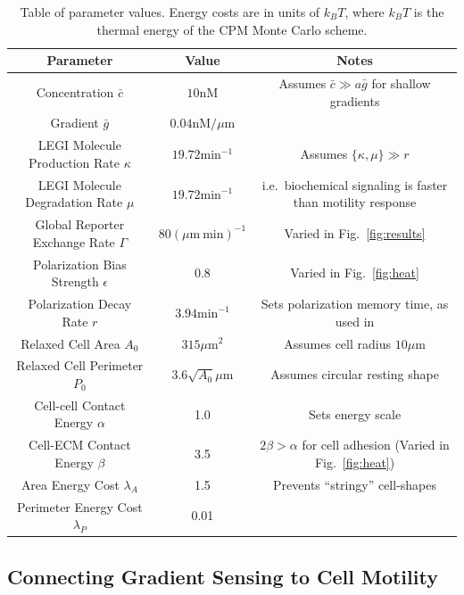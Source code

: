 \begin{table}[b]
\centering
\footnotesize
\begin{tabular}{ |c|c|c| }
\hline
Parameter & Value & Notes \\ \hline
Concentration $\bar{c}$ & $10 \text{nM}$ & Assumes $\bar{c} \gg a\bar{g}$ for shallow gradients \cite{malet2015collective,ellison2016cell} \\
Gradient $\bar{g}$ & $0.04 \text{nM/}\mu\text{m}$ & \\ \hline
LEGI Molecule Production Rate $\kappa$ & $19.72 \text{min}^{-1}$ & Assumes $ \{\kappa,\mu\} \gg r$ \\
LEGI Molecule Degradation Rate $\mu$ & $19.72 \text{min}^{-1}$ & i.e.\ biochemical signaling is faster than motility response \\ \hline
Global Reporter Exchange Rate $\Gamma$ & $80 (\mu\text{m} \ \text{min})^{-1}$ & Varied in Fig.\ \ref{fig:results} \\ \hline
Polarization Bias Strength $\epsilon$ & 0.8 & Varied in Fig.\ \ref{fig:heat} \\ \hline
Polarization Decay Rate $r$ & $3.94 \text{min}^{-1}$ & Sets polarization memory time, as used in \cite{szabo2010collective} \\ \hline
Relaxed Cell Area $A_0$ & $315 \mu\text{m}^2$ & Assumes cell radius $10 \mu\text{m}$ \cite{leber2009molecular} \\ \hline
Relaxed Cell Perimeter $P_0$ & $3.6\sqrt{A_0} \mu\text{m}$ & Assumes circular resting shape \\ \hline
Cell-cell Contact Energy $\alpha$ & 1.0 & Sets energy scale \\
Cell-ECM Contact Energy $\beta$ & 3.5 & $2\beta > \alpha$ for cell adhesion \cite{graner1992simulation} (Varied in Fig.\ \ref{fig:heat}) \\ \hline
Area Energy Cost $\lambda_A$ & 1.5  & Prevents ``stringy'' cell-shapes \\
Perimeter Energy Cost $\lambda_P$ & 0.01 & \\ \hline
\end{tabular}
\caption{Table of parameter values. Energy costs are in units of $k_B T$, where $k_B T$ is the thermal energy of the CPM Monte Carlo scheme.}
\label{table:ch4_1}
\end{table}


\subsection{Connecting Gradient Sensing to Cell Motility}

